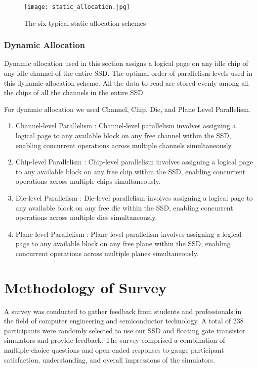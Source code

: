 \documentclass[conference]{/home/habib/Desktop/flash_ssd_simulator_web/paper_writing/latex_file/IEEEtran}
\begin{document}
\begin{figure}[h]
    \centering
    \texttt{[image: static\_allocation.jpg]}
    \caption{The six typical static allocation schemes}
    \label{fig:static_allocation}
\end{figure}
\subsubsection{Dynamic Allocation}
Dynamic allocation used in this section assigns a logical page on any idle chip of any idle channel of the entire SSD. The optimal order of parallelism levels used in this dynamic allocation scheme. All the data to read are stored evenly among all the chips of all the channels in the entire SSD. 

For dynamic allocation we used Channel, Chip, Die, and Plane Level Parallelism. 
\begin{enumerate}
    \item Channel-level Parallelism : Channel-level parallelism involves assigning a logical page to any available block on any free channel within the SSD, enabling concurrent operations across multiple channels simultaneously.
    \item Chip-level Parallelism : Chip-level parallelism involves assigning a logical page to any available block on any free chip within the SSD, enabling concurrent operations across multiple chips simultaneously.
    \item Die-level Parallelism : Die-level parallelism involves assigning a logical page to any available block on any free die within the SSD, enabling concurrent operations across multiple dies simultaneously.
    \item Plane-level Parallelism : Plane-level parallelism involves assigning a logical page to any available block on any free plane within the SSD, enabling concurrent operations across multiple planes simultaneously.
\end{enumerate}

\section{Methodology of Survey}
A survey was conducted to gather feedback from students and professionals in the field of computer engineering and semiconductor technology. A total of 238 participants were randomly selected to use our SSD and floating gate transistor simulators and provide feedback. The survey comprised a combination of multiple-choice questions and open-ended responses to gauge participant satisfaction, understanding, and overall impressions of the simulators.
\end{document}
